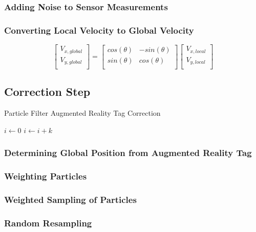 	\subsubsection{Adding Noise to Sensor Measurements}
	
	\subsubsection{Converting Local Velocity to Global Velocity}
	\[
	\begin{bmatrix} 
	  V_{x, global}\\
	  V_{y, global}\\
	\end{bmatrix}
	=
	\begin{bmatrix} 
	  cos(\theta) & -sin(\theta)\\
	  sin(\theta) & cos(\theta)\\
	\end{bmatrix}
	\begin{bmatrix} 
	  V_{x, local}\\
	  V_{y, local}\\
	\end{bmatrix}
	\]

\subsection{Correction Step}

	\begin{algorithm}
		\centering
		\caption{Particle Filter Augmented Reality Tag Correction} 
		\begin{algorithmic}[1]
			    \State $i\gets 0$
			\Else
			        \State $i\gets i+k$
			    \EndIf
			\EndIf
		\end{algorithmic}
	\end{algorithm}

	\subsubsection{Determining Global Position from Augmented Reality Tag}


	\subsubsection{Weighting Particles}


	\subsubsection{Weighted Sampling of Particles}

	\subsubsection{Random Resampling}



